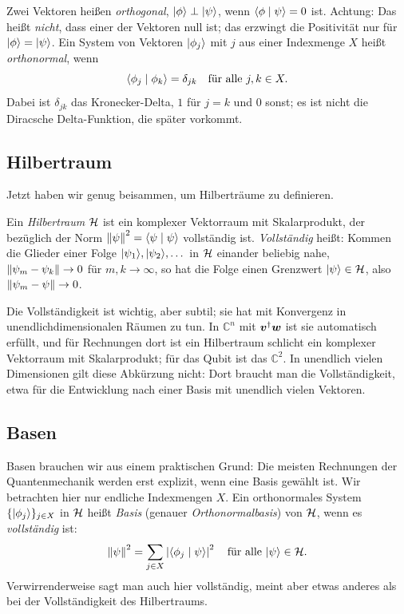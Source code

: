 Zwei Vektoren heißen \emph{orthogonal}, $\lvert \phi \rangle \perp \lvert \psi \rangle$, wenn $\langle \phi \mid \psi \rangle = 0$ ist. Achtung: Das heißt \emph{nicht}, dass einer der Vektoren null ist; das erzwingt die Positivität nur für $\lvert \phi \rangle = \lvert \psi \rangle$. Ein System von Vektoren $\lvert \phi_j \rangle$ mit $j$ aus einer Indexmenge $X$ heißt \emph{orthonormal}, wenn
\begin{equation}
	\langle \phi_j \mid \phi_k \rangle = \delta_{jk} \quad \text{für alle } j,k\in X.
\end{equation}
Dabei ist $\delta_{jk}$ das Kronecker-Delta, $1$ für $j = k$ und $0$ sonst; es ist nicht die Diracsche Delta-Funktion, die später vorkommt.

\subsection{Hilbertraum}
Jetzt haben wir genug beisammen, um Hilberträume zu definieren.

\begin{definition}
	Ein \emph{Hilbertraum} $\mathcal{H}$ ist ein komplexer Vektorraum mit Skalarprodukt, der bezüglich der Norm $\left\lVert \psi \right\rVert^2 = \langle \psi \mid \psi \rangle$ vollständig ist. \emph{Vollständig} heißt: Kommen die Glieder einer Folge $\lvert \psi_1 \rangle,\lvert \psi_2 \rangle,\dots$ in $\mathcal{H}$ einander beliebig nahe, $\left\lVert \psi_m - \psi_k \right\rVert \to 0$ für $m,k \to \infty$, so hat die Folge einen Grenzwert $\lvert \psi \rangle\in\mathcal{H}$, also $\left\lVert \psi_m - \psi \right\rVert \to 0$.
\end{definition}

Die Vollständigkeit ist wichtig, aber subtil; sie hat mit Konvergenz in unendlichdimensionalen Räumen zu tun. In $\mathbb{C}^n$ mit $\boldsymbol{v}^{\dagger}\boldsymbol{w}$ ist sie automatisch erfüllt, und für Rechnungen dort ist ein Hilbertraum schlicht ein komplexer Vektorraum mit Skalarprodukt; für das Qubit ist das $\mathbb{C}^2$. In unendlich vielen Dimensionen gilt diese Abkürzung nicht: Dort braucht man die Vollständigkeit, etwa für die Entwicklung nach einer Basis mit unendlich vielen Vektoren.

\subsection{Basen}
Basen brauchen wir aus einem praktischen Grund: Die meisten Rechnungen der Quantenmechanik werden erst explizit, wenn eine Basis gewählt ist. Wir betrachten hier nur endliche Indexmengen $X$. Ein orthonormales System $\{\lvert \phi_j \rangle\}_{j\in X}$ in $\mathcal{H}$ heißt \emph{Basis} (genauer \emph{Orthonormalbasis}) von $\mathcal{H}$, wenn es \emph{vollständig} ist:
\begin{equation}
	\left\lVert \psi \right\rVert^2 = \sum_{j\in X}\left\lvert \langle \phi_j \mid \psi \rangle \right\rvert^2 \quad \text{für alle } \lvert \psi \rangle\in\mathcal{H}.
\end{equation}
Verwirrenderweise sagt man auch hier vollständig, meint aber etwas anderes als bei der Vollständigkeit des Hilbertraums.


